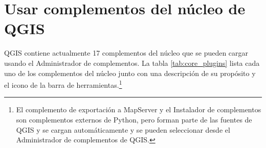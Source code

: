 
\section{Usar complementos del núcleo de QGIS}\label{sec:core_plugins}


QGIS contiene actualmente 17 complementos del núcleo que se pueden cargar usando el Administrador de complementos.
La tabla \ref{tab:core_plugins} lista cada uno de los complementos del núcleo junto con una
descripción de su propósito y el icono de la barra de herramientas.\footnote{El complemento
de exportación a MapServer y el Instalador de complementos son complementos externos de Python,
pero forman parte de las fuentes de QGIS y se cargan automáticamente y se pueden seleccionar 
desde el Administrador de complementos de QGIS.}

